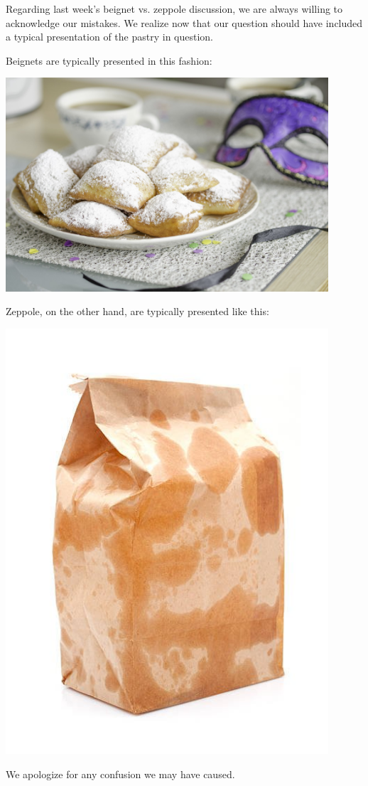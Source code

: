 \documentclass[11pt]{beamer}
\begin{document}
\begingroup{}
\begin{frame}[t]{}
Regarding last week's beignet vs. zeppole discussion, we are always willing to
acknowledge our mistakes.  We realize now that our question should have included a
typical presentation of the pastry in question.

Beignets are typically presented in this fashion:
\pause{}
\begin{center}
\includegraphics[max width=0.9\textwidth,
    max height=0.4\textheight]{Images/beignet.jpg}
\end{center}
\end{frame}
\begin{frame}[t]{}
Zeppole, on the other hand, are typically presented like this:
\pause{}
\begin{center}
\includegraphics[max width=0.9\textwidth,
    max height=0.4\textheight]{Images/zeppole.jpg}
\end{center}
\pause{}
We apologize for any confusion we may have caused.
\end{frame}
\endgroup{}
\end{document}
